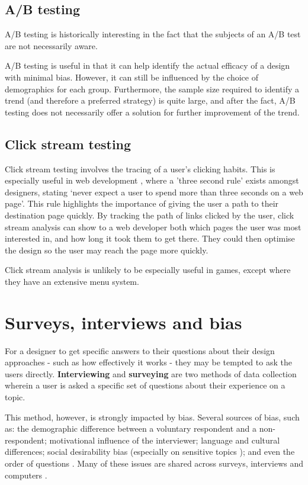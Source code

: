 \documentclass{scrartcl}
\begin{document}
\subsection{A/B testing}
A/B testing is historically interesting in the fact that the subjects of an A/B test are not necessarily aware.

A/B testing is useful in that it can help identify the actual efficacy of a design with minimal bias. However, it can still be influenced by the choice of demographics for each group. Furthermore, the sample size required to identify a trend (and therefore a preferred strategy) is quite large, and after the fact, A/B testing does not necessarily offer a solution for further improvement of the trend.

\subsection{Click stream testing}
Click stream testing involves the tracing of a user's clicking habits. This is especially useful in web development , where a 'three second rule' exists amongst designers, stating `never expect a user to spend more than three seconds on a web page'. This rule highlights the importance of giving the user a path to their destination page quickly. By tracking the path of links clicked by the user, click stream analysis can show to a web developer both which pages the user was most interested in, and how long it took them to get there. They could then optimise the design so the user may reach the page more quickly.

Click stream analysis is unlikely to be especially useful in games, except where they have an extensive menu system.

\section{Surveys, interviews and bias}
For a designer to get specific answers to their questions about their design approaches - such as how effectively it works - they may be tempted to ask the users directly. \textbf{Interviewing} and \textbf{surveying} are two methods of data collection wherein a user is asked a specific set of questions about their experience on a topic.

This method, however, is strongly impacted by bias. Several sources of bias, such as: the demographic difference between a voluntary respondent and a non-respondent; motivational influence of the interviewer; language and cultural differences; social desirability bias (especially on sensitive topics \cite{sensitivetopics}); and even the order of questions \cite{questionnairebias}. Many of these issues are shared across surveys, interviews and computers \cite{moresurveybias} \cite{questionnairebias}.
\end{document}
